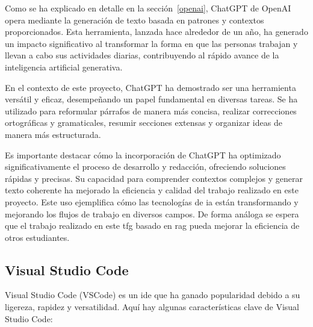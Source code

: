 Como se ha explicado en detalle en la sección~\ref{openai}, ChatGPT de OpenAI opera mediante la generación de texto basada en patrones y contextos proporcionados. Esta herramienta, lanzada hace alrededor de un año, ha generado un impacto significativo al transformar la forma en que las personas trabajan y llevan a cabo sus actividades diarias, contribuyendo al rápido avance de la inteligencia artificial generativa.

En el contexto de este proyecto, ChatGPT ha demostrado ser una herramienta versátil y eficaz, desempeñando un papel fundamental en diversas tareas. Se ha utilizado para reformular párrafos de manera más concisa, realizar correcciones ortográficas y gramaticales, resumir secciones extensas y organizar ideas de manera más estructurada.

Es importante destacar cómo la incorporación de ChatGPT ha optimizado significativamente el proceso de desarrollo y redacción, ofreciendo soluciones rápidas y precisas. Su capacidad para comprender contextos complejos y generar texto coherente ha mejorado la eficiencia y calidad del trabajo realizado en este proyecto. Este uso ejemplifica cómo las tecnologías de \acrlong{ia} están transformando y mejorando los flujos de trabajo en diversos campos. De forma análoga se espera que el trabajo realizado en este \acrshort{tfg} basado en \acrshort{rag} pueda mejorar la eficiencia de otros estudiantes.

\subsection{Visual Studio Code} 

Visual Studio Code (VSCode) es un \acrfull{ide} que ha ganado popularidad debido a su ligereza, rapidez y versatilidad. Aquí hay algunas características clave de Visual Studio Code:

